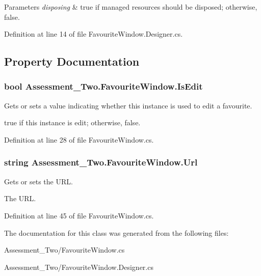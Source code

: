 \begin{DoxyParams}{Parameters}
{\em disposing} & true if managed resources should be disposed; otherwise, false.\\
\hline
\end{DoxyParams}


Definition at line 14 of file FavouriteWindow.Designer.cs.



\subsection{Property Documentation}
\hypertarget{class_assessment___two_1_1_favourite_window_a83eda3136770a534d9d3bc6cef5ba7e9}{
\subsubsection[{IsEdit}]{\setlength{\rightskip}{0pt plus 5cm}bool Assessment\_\-Two.FavouriteWindow.IsEdit}}
\label{class_assessment___two_1_1_favourite_window_a83eda3136770a534d9d3bc6cef5ba7e9}


Gets or sets a value indicating whether this instance is used to edit a favourite. 

{\ttfamily true} if this instance is edit; otherwise, {\ttfamily false}.

Definition at line 28 of file FavouriteWindow.cs.

\hypertarget{class_assessment___two_1_1_favourite_window_a5989bc66c2e8ec5414935a1ce3ba47d8}{
\subsubsection[{Url}]{\setlength{\rightskip}{0pt plus 5cm}string Assessment\_\-Two.FavouriteWindow.Url}}
\label{class_assessment___two_1_1_favourite_window_a5989bc66c2e8ec5414935a1ce3ba47d8}


Gets or sets the URL. 

The URL.

Definition at line 45 of file FavouriteWindow.cs.



The documentation for this class was generated from the following files:\begin{DoxyCompactItemize}
\item 
Assessment\_\-Two/FavouriteWindow.cs\item 
Assessment\_\-Two/FavouriteWindow.Designer.cs\end{DoxyCompactItemize}

